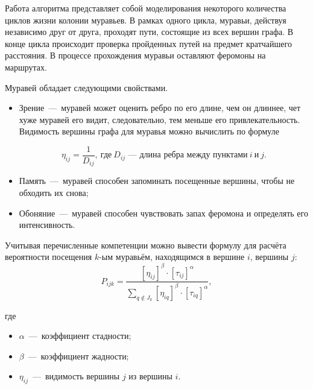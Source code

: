 Работа алгоритма представляет собой моделирования некоторого количества циклов жизни колонии муравьев. В рамках одного цикла, муравьи, действуя независимо друг от друга, проходят пути, состоящие из всех вершин графа. В конце цикла происходит проверка пройденных путей на предмет кратчайшего расстояния. В процессе прохождения муравьи оставляют феромоны на маршрутах.

Муравей обладает следующими свойствами.

\begin{itemize}
	\item Зрение~---~муравей может оценить ребро по его длине, чем он длиннее, чет хуже муравей его видит, следовательно, тем меньше его привлекательность. Видимость вершины графа для муравья можно вычислить по формуле
	
	\begin{equation}
		\eta_{ij} = \frac{1}{D_{ij}}, \  \text{где} \  D_{ij}\text{~---~длина ребра между пунктами} \ i \  \text{и} \  j.
	\end{equation}
	\item Память~---~муравей способен запоминать посещенные вершины, чтобы не обходить их снова;
	\item Обоняние~---~муравей способен чувствовать запах феромона и определять его интенсивность.

\end{itemize}

Учитывая перечисленные компетенции можно вывести формулу для расчёта вероятности посещения $k$-ым муравьём, находящимся в вершине $i$, вершины  $j$:
\begin{equation} \label{eqn:1}
	P_{ijk} = \frac{\left[\eta_{ij}\right]^{\beta} \cdot \left[\tau_{ij}\right]^{\alpha}}{\sum_{q \notin J_k} \left[\eta_{iq}\right]^{\beta} \cdot \left[\tau_{iq}\right]^{\alpha}},
\end{equation}

где

\begin{itemize}
	\item $\alpha$~---~коэффициент стадности;
	\item $\beta$~---~коэффициент жадности;
	\item $\eta_{ij}$~---~видимость вершины $j$ из вершины $i$.
\end{itemize}

%

